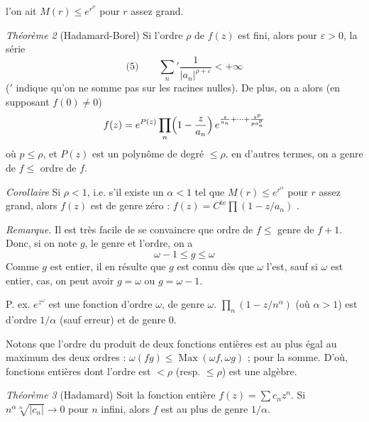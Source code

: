 \documentclass[11pt,a4paper]{article}
\begin{document}
l'on ait $M(r) \leq e^{r^\sigma}$ pour $r$ assez grand.

\emph{Théorème 2} (Hadamard-Borel) Si l'ordre $\rho$ de $f(z)$ est fini, alors pour  $\varepsilon > 0$, la série
\[
  \text{(5)}\qquad {\sum_n}' \frac{1}{|a_n|^{\rho+\varepsilon}} < +\infty
\]
($'$ indique qu'on ne somme pas sur les racines nulles). De plus, on a alors (en supposant $f(0) \neq 0$)
\[
  f(z) = e^{P(z)} \prod_n \Bigl(1 - \frac{z}{a_n}\Bigr)\, e^{\frac{z}{a_n} + \cdots + \frac{z^p}{p a_n^p}}
\]
où $p \leq \rho$, et $P(z)$ est un polynôme de degré $\leq \rho$. en d'autres termes, on a genre de $f \leq$ \uncertain{$\rho =$} ordre de $f$.


\emph{Corollaire} Si $\rho < 1$, i.e. s'il existe un $\alpha < 1$ tel que $M(r) \leq e^{r^\alpha}$ pour $r$ assez grand, alors $f(z)$ est de genre zéro : $f(z) = C^{\mathrm{te}} \prod (1 - z/a_n)$ \struck{\ill{}}.

\emph{Remarque.} Il est très facile de se convaincre que ordre de $f \leq$ genre de $f + 1$. Donc, si on note $g$, \uncertain{$\omega$}  le genre et l'ordre, on a
\[
  \omega - 1 \leq g \leq \omega
\]
 Comme $g$ est entier, il en résulte que $g$ est connu dès que $\omega$ l'est, sauf si $\omega$ est entier,  cas, on peut avoir $g = \omega$ ou $g = \omega - 1$.

P. ex. $e^{z^\omega}$  est une fonction d'ordre $\omega$, de genre $\omega$. $\prod_n (1 - z/n^\alpha)$ (où $\alpha > 1$) est d'ordre $1/\alpha$  (sauf erreur) et de genre $0$.

Notons que l'ordre du produit de deux fonctions entières est au plus égal au maximum des deux ordres : $\omega(fg) \leq \operatorname{Max}(\omega f, \omega g)$ ;    pour la somme. D'où,   fonctions entières dont l'ordre est $< \rho$  (resp. $\leq \rho$) est une \struck{\ill{}} algèbre.

\emph{Théorème 3} (Hadamard) Soit la fonction entière $f(z) = \sum c_n z^n$. Si $n^\alpha \sqrt[n]{|c_n|} \to 0$ pour $n$ infini, alors $f$ est au plus de genre $1/\alpha$. 
\end{document}
